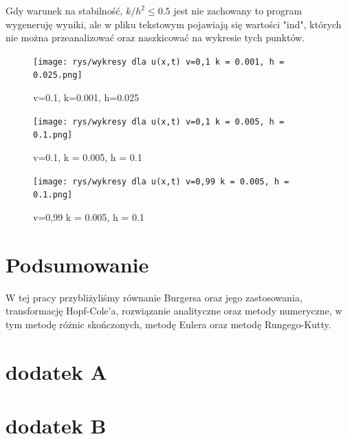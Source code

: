 \documentclass[a4paper,12pt]{article}
\begin{document}
	Gdy warunek na stabilność, $k/h^2\le0.5$ jest nie zachowany to program wygeneruję wyniki, ale w pliku tekstowym pojawiają się wartości "ind", których nie można przeanalizować oraz naszkicować na wykresie tych punktów.  
	\begin{figure}
		\centering
		\texttt{[image: rys/wykresy dla u(x,t) v=0,1 k = 0.001, h = 0.025.png]}
		\caption{v=0.1, k=0.001, h=0.025}
		\label{wyk11}
	\end{figure}
	\begin{figure}
		\centering
		\texttt{[image: rys/wykresy dla u(x,t) v=0,1 k = 0.005, h = 0.1.png]}
		\caption{v=0.1,  k = 0.005, h = 0.1}
		\label{wyk12}
	\end{figure}
	\begin{figure}
		\centering
		\texttt{[image: rys/wykresy dla u(x,t) v=0,99 k = 0.005, h = 0.1.png]}
		\caption{v=0,99 k = 0.005, h = 0.1}
		\label{wyk13}
	\end{figure}
	\section{Podsumowanie}
	W tej pracy przybliżyliśmy równanie Burgersa oraz jego zastosowania, transformację Hopf-Cole'a, rozwiązanie analityczne oraz metody numeryczne, w tym metodę różnic skończonych, metodę Eulera oraz metodę Rungego-Kutty.
	
	\newpage
	\section{dodatek A}
	
	
	
	
	
	
	
	
	
	
	
	
	
	
	
	
	
	
	
	
	
	\section{dodatek B}
	
\end{document}
